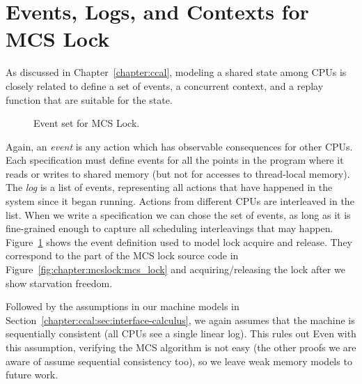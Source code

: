 \section{Events, Logs, and  Contexts for MCS Lock}
\label{chapter:mcslock:sec:eventlogandoracle}

As discussed in Chapter~\ref{chapter:ccal}, 
modeling a shared state among CPUs is 
closely related to define a set of events, a concurrent context, and a replay function that are suitable for
the state.
\begin{figure}
\begin{minipage}{\linewidth}

\end{minipage}
\caption{Event set for MCS Lock.}
\label{fig:chapter:mcslock:lock_event_type}
\end{figure}
Again, an \emph{event} is any action which has observable consequences for
other CPUs. Each specification must define events for all the points
in the program where it reads or writes to shared memory (but not for
accesses to thread-local memory). The \emph{log} is a list of
events, representing all actions that have happened in the system
since it began running. Actions from different CPUs are interleaved in
the list.
When we write a specification we can chose the set of events, as long
as it is fine-grained enough to capture all scheduling interleavings
that may happen.
Figure~\ref{fig:chapter:mcslock:lock_event_type} shows the event definition used to
model lock acquire and release. They correspond to the part of the MCS lock source code in Figure~\ref{fig:chapter:mcslock:mcs_lock}
and acquiring/releasing the lock after we show starvation freedom. 

Followed by the assumptions in our machine models in Section~\ref{chapter:ccal:sec:interface-calculus},  we again assumes that the
machine is sequentially consistent (all CPUs see a single linear log). 
This rules out 
Even with this assumption,
verifying the MCS algorithm is not easy (the other proofs we are aware
of assume sequential consistency too), so we leave weak memory models
to future work.

